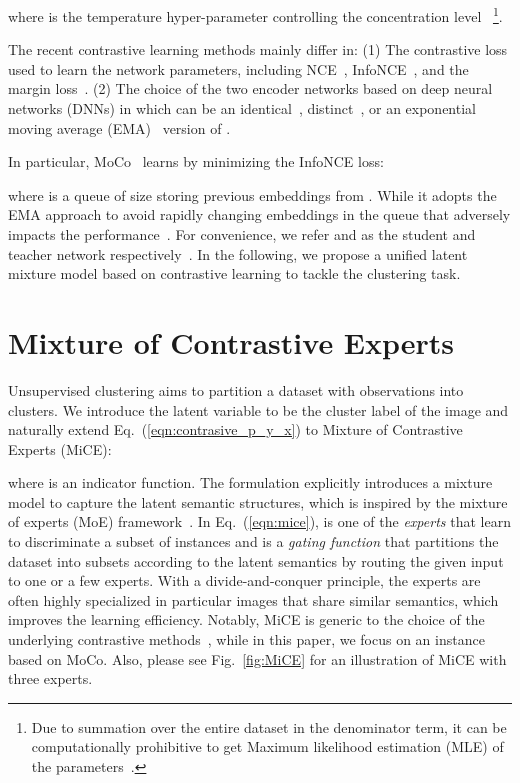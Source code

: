 \documentclass{article} \usepackage{iclr2021_conference,times}
\begin{document}
where  is the temperature hyper-parameter controlling the concentration level~\citep{hinton2015distilling} \footnote{Due to summation over the entire dataset in the denominator term, it can be computationally prohibitive to get Maximum likelihood estimation (MLE) of the parameters~\citep{ma2018noise}.}.

The recent contrastive learning methods mainly differ in: 
(1) The contrastive loss used to learn the network parameters, including NCE~\citep{wu2018unsupervised}, InfoNCE~\citep{oord2018representation}, and the margin loss~\citep{schroff2015facenet}.
(2) The choice of the two encoder networks based on deep neural networks (DNNs) in which  can be an identical~\citep{ye2019unsupervised,chen2020simple}, distinct~\citep{tian2019contrastive}, or an exponential moving average (EMA)~\citep{he2019momentum} version of .  

In particular, MoCo~\citep{he2019momentum} learns by minimizing the InfoNCE loss:

where  is a queue of size  storing previous embeddings from . While it adopts the EMA approach to avoid rapidly changing embeddings in the queue that adversely impacts the performance~\citep{he2019momentum}. For convenience, we refer  and  as the student and teacher network respectively~\citep{tarvainen2017mean,tsai2019d}.  In the following, we propose a unified latent mixture model based on contrastive learning to tackle the clustering task. 


\section{Mixture of Contrastive Experts}
Unsupervised clustering aims to partition a dataset  with  observations into  clusters.  We introduce the latent variable  to be the cluster
label of the image  and naturally extend  Eq.~(\ref{eqn:contrasive_p_y_x}) to Mixture of Contrastive Experts (MiCE):

where  is an indicator function. 
The formulation explicitly introduces a mixture model to capture the latent semantic structures, which is inspired by the mixture of experts (MoE) framework~\citep{jacobs1991adaptive}. In Eq.~(\ref{eqn:mice}),
 is one of the \textit{experts} that learn to discriminate a subset of instances and  is a \textit{gating function} that partitions the dataset into subsets according to the latent semantics by routing the given input to one or a few experts. 
With a divide-and-conquer principle, the experts are often highly specialized in particular images that share similar semantics, which improves the learning efficiency. 
Notably, MiCE is generic to the choice of the underlying contrastive methods~\citep{wu2018unsupervised,he2019momentum,chen2020simple}, while in this paper, we focus on an instance based on MoCo. Also, please see Fig.~\ref{fig:MiCE} for an illustration of MiCE with three experts.
\end{document}
